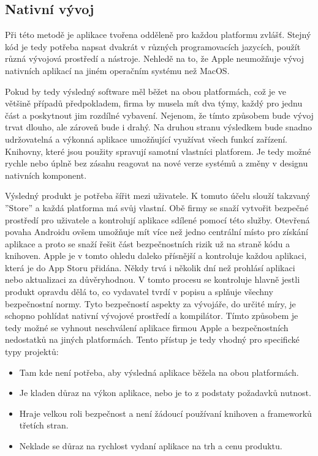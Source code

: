 \documentclass[
  biblatex,
  glossaries,
  index
]{kidiplom}
\begin{document}
\subsection{Nativní vývoj}
Při této metodě je aplikace tvořena odděleně pro každou platformu zvlášť. Stejný kód je tedy potřeba napsat dvakrát v různých programovacích jazycích, použít různá vývojová prostředí a nástroje. Nehledě na to, že Apple neumožňuje vývoj nativních aplikací na jiném operačním systému než MacOS. 

Pokud by tedy výsledný software měl běžet na obou platformách, což je ve většině případů předpokladem, firma by musela mít dva týmy, každý pro jednu část a poskytnout jim rozdílné vybavení. Nejenom, že tímto způsobem bude vývoj trvat dlouho, ale zároveň bude i drahý. Na druhou stranu výsledkem bude snadno udržovatelná a výkonná aplikace umožňující využívat všech funkcí zařízení. Knihovny, které jsou použity spravují samotní vlastníci platforem. Je tedy možné rychle nebo úplně bez zásahu reagovat na nové verze systémů a změny v designu nativních komponent. 

Výsledný produkt je potřeba šířit mezi uživatele. K tomuto účelu slouží takzvaný ''Store'' a každá platforma má svůj vlastní. Obě firmy se snaží vytvořit bezpečné prostředí pro uživatele a kontrolují aplikace sdílené pomocí této služby. Otevřená povaha Androidu ovšem umožňuje mít více než jedno centrální místo pro získání aplikace a proto se snaží řešit část bezpečnostních rizik už na straně kódu a knihoven. Apple je v tomto ohledu daleko přísnější a kontroluje každou aplikaci, která je do App Storu přidána. Někdy trvá i několik dní než prohlásí aplikaci nebo aktualizaci za důvěryhodnou. V tomto procesu se kontroluje hlavně jestli produkt opravdu dělá to, co vydavatel tvrdí v popisu a splňuje všechny bezpečnostní normy. Tyto bezpečností aspekty za vývojáře, do určité míry, je schopno pohlídat nativní vývojové prostředí a kompilátor. Tímto způsobem je tedy možné se vyhnout neschválení aplikace firmou Apple a bezpečnostních nedostatků na jiných platformách. Tento přístup je tedy vhodný pro specifické typy projektů:
\begin{itemize}
	\item Tam kde není potřeba, aby výsledná aplikace běžela na obou platformách.
  	\item Je kladen důraz na výkon aplikace, nebo je to z podstaty požadavků nutnost.
  	\item Hraje velkou roli bezpečnost a není žádoucí používaní knihoven a frameworků třetích stran. 
  	\item Neklade se důraz na rychlost vydaní aplikace na trh a cenu produktu.
 \end{itemize}
\end{document}

